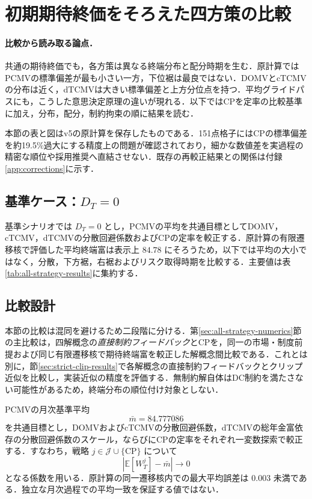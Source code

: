 \documentclass[10pt,a4paper]{article}
\theoremstyle{plain}
\theoremstyle{definition}
\newcommand{\E}{\mathbb{E}}
\begin{document}
\section{初期期待終価をそろえた四方策の比較}\label{sec:numerical-results}
\label{sec:all-strategy-numerics}

\paragraph{比較から読み取る論点．}
共通の期待終価でも，各方策は異なる終端分布と配分時期を生む．原計算ではPCMVの標準偏差が最も小さい一方，下位裾は最良ではない．DOMVとcTCMVの分布は近く，dTCMVは大きい標準偏差と上方分位点を持つ．平均グライドパスにも，こうした意思決定原理の違いが現れる．以下ではCPを定率の比較基準に加え，分布，配分，制約拘束の順に結果を読む．

本節の表と図はv5の原計算を保存したものである．151点格子にはCPの標準偏差を約19.5\%過大にする精度上の問題が確認されており，細かな数値差を実過程の精密な順位や採用推奨へ直結させない．既存の再較正結果との関係は付録\ref{app:corrections}に示す．

\subsection{基準ケース：\texorpdfstring{$D_T=0$}{DT=0}}

基準シナリオでは $D_T=0$ とし，PCMVの平均を共通目標としてDOMV，cTCMV，dTCMVの分散回避係数およびCPの定率を較正する．原計算の有限遷移核で評価した平均終端富は表示上 $84.78$ にそろうため，以下では平均の大小ではなく，分散，下方裾，右裾およびリスク取得時期を比較する．主要値は表\ref{tab:all-strategy-results}に集約する．

\subsection{比較設計}

本節の比較は混同を避けるため二段階に分ける．第\ref{sec:all-strategy-numerics}節の主比較は，四解概念の\emph{直接制約フィードバック}とCPを，同一の市場・制度前提および同じ有限遷移核で期待終端富を較正した解概念間比較である．これとは別に，節\ref{sec:strict-clip-results}で各解概念の直接制約フィードバックとクリップ近似を比較し，実装近似の精度を評価する．無制約解自体はDC制約を満たさない可能性があるため，終端分布の順位付け対象としない．

PCMVの月次基準平均
\[
  \bar m=84.777086
\]
を共通目標とし，DOMVおよびcTCMVの分散回避係数，dTCMVの総年金富依存の分散回避係数のスケール，ならびにCPの定率をそれぞれ一変数探索で較正する．すなわち，戦略 $j\in\mathcal J\cup\{\mathrm{CP}\}$ について
\begin{equation}
  \left|\E[W_T^{j}]-\bar m\right|\longrightarrow 0
  \label{eq:equal-mean-calibration}
\end{equation}
となる係数を用いる．原計算の同一遷移核内での最大平均誤差は $0.003$ 未満である．独立な月次過程での平均一致を保証する値ではない．
\end{document}
